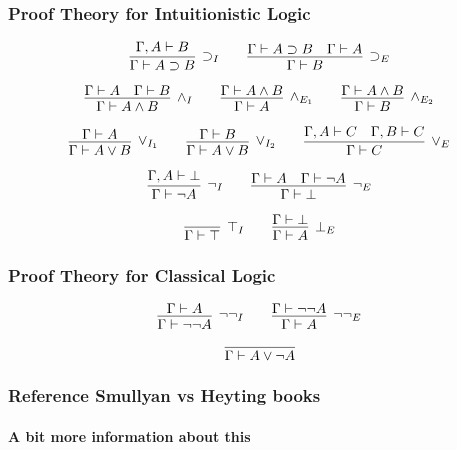 \documentclass[mathserif]{beamer}
\def\imp{\supset}
\newcommand{\turn}[1]{\Gamma \vdash #1}
\newcommand{\cturn}[2]{\Gamma , #1 \vdash #2}
\begin{document}
\begin{frame}
\frametitle{Proof Theory for Intuitionistic Logic}

$$
\infer
  [\imp_I]
  {\turn{A \imp B}}
{
  {\cturn{A}{B}}
}
\qquad
\infer
  [\imp_E]
  {\turn{B}}
{
  {\turn{A \imp B}}
  &
  {\turn{A}}
}
$$

$$
\infer
  [\land_I]
  {\turn{A \land B}}
{
  {\turn{A}}
  &
  {\turn{B}}
}
\qquad
\infer
  [\land_{E_1}]
  {\turn{A}}
{
  {\turn{A \land B}}
}
\qquad
\infer
  [\land_{E_2}]
  {\turn{B}}
{
  {\turn{A \land B}}
}
$$

$$
\infer
  [\lor_{I_1}]
  {\turn{A \lor B}}
{
  {\turn{A}}
}
\qquad
\infer
  [\lor_{I_2}]
  {\turn{A \lor B}}
{
  {\turn{B}}
}
\qquad
\infer
  [\lor_E]
  {\turn{C}}
{
  {\cturn{A}{C}}
  &
  {\cturn{B}{C}}
}
$$

$$
\infer
  [\neg_I]
  {\turn{\neg A}}
{
  {\cturn{A}{\bot}}
}
\qquad
\infer
  [\neg_E]
  {\turn{\bot}}
{
  {\turn{A}}
  &
  {\turn{\neg A}}
}
$$

$$
\infer
  [\top_I]
  {\turn{\top}}
{
}
\qquad
\infer
  [\bot_E]
  {\turn{A}}
{
  {\turn{\bot}}
}
$$

\end{frame}

\begin{frame}
\frametitle{Proof Theory for Classical Logic}


$$
\infer
  [\neg\neg_I]
  {\turn{\neg\neg A}}
{
  {\turn{A}}
}
\qquad
\infer
  [\neg\neg_E]
  {\turn{A}}
{
  {\turn{\neg\neg A}}
}
$$


$$
\infer{\turn{A \lor \neg A}}
{}
$$

\end{frame}

\begin{frame}
\frametitle{Reference Smullyan vs Heyting books}
\framesubtitle{A bit more information about this}

\end{frame}
\end{document}
